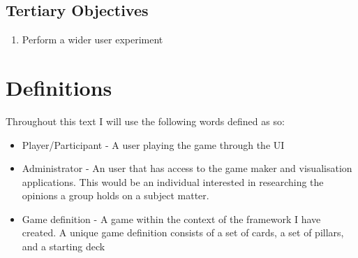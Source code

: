 \subsection{Tertiary Objectives}
\begin{enumerate}[label=\textbf{TO.\arabic*}]
    \item Perform a wider user experiment
\end{enumerate}

\section{Definitions}
Throughout this text I will use the following words defined as so:
\begin{itemize}
    \item Player/Participant - A user playing the game through the UI
    \item Administrator - An user that has access to the game maker and visualisation applications. This would be an individual interested in researching the opinions a group holds on a subject matter.
    \item Game definition - A game within the context of the framework I have created. A unique game definition consists of a set of cards, a set of pillars, and a starting deck
\end{itemize}